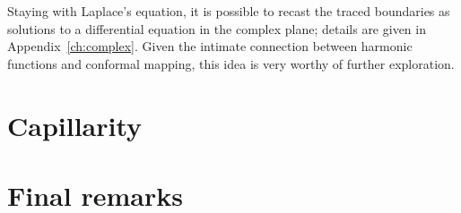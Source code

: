 Staying with Laplace's equation,
it is possible to recast the traced boundaries
as solutions to a differential equation in the complex plane;
details are given in Appendix~\ref{ch:complex}.
Given the intimate connection between
harmonic functions and conformal mapping,
this idea is very worthy of further exploration.

\section{Capillarity}
\label{sec:concluding.capillarity}

\section{Final remarks}
\label{sec:concluding.final}
